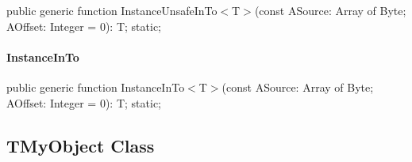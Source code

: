 \documentclass{report}
\newif\ifpdf
\begin{document}
\label{ok_generic.TBitConverter-InstanceUnsafeInTo}
\begin{list}{}{
\setlength{\itemindent}{0cm}
\setlength{\listparindent}{0cm}
\setlength{\leftmargin}{\evensidemargin}
\addtolength{\leftmargin}{\tmplength}
\settowidth{\labelsep}{X}
\addtolength{\leftmargin}{\labelsep}
\setlength{\labelwidth}{\tmplength}
}
\item[\textbf{Declaration}\hfill]
\ifpdf
\begin{flushleft}
\fi
\begin{ttfamily}
public generic function InstanceUnsafeInTo{$<$}T{$>$}(const ASource: Array of Byte; AOffset: Integer = 0): T; static;\end{ttfamily}

\ifpdf
\end{flushleft}
\fi

\end{list}
\paragraph*{InstanceInTo}\hspace*{\fill}

\label{ok_generic.TBitConverter-InstanceInTo}
\begin{list}{}{
\setlength{\itemindent}{0cm}
\setlength{\listparindent}{0cm}
\setlength{\leftmargin}{\evensidemargin}
\addtolength{\leftmargin}{\tmplength}
\settowidth{\labelsep}{X}
\addtolength{\leftmargin}{\labelsep}
\setlength{\labelwidth}{\tmplength}
}
\item[\textbf{Declaration}\hfill]
\ifpdf
\begin{flushleft}
\fi
\begin{ttfamily}
public generic function InstanceInTo{$<$}T{$>$}(const ASource: Array of Byte; AOffset: Integer = 0): T; static;\end{ttfamily}

\ifpdf
\end{flushleft}
\fi

\end{list}
\ifpdf
\subsection*{\large{\textbf{TMyObject Class}}\normalsize\hspace{1ex}\hrulefill}
\else
\subsection*{TMyObject Class}
\fi
\label{ok_generic.TMyObject}
\end{document}
